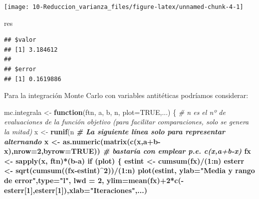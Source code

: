\documentclass[
]{book}
\newenvironment{Shaded}{\begin{snugshade}}{\end{snugshade}}
\newcommand{\CommentTok}[1]{\textcolor[rgb]{0.56,0.35,0.01}{\textit{#1}}}
\newcommand{\ControlFlowTok}[1]{\textcolor[rgb]{0.13,0.29,0.53}{\textbf{#1}}}
\newcommand{\DataTypeTok}[1]{\textcolor[rgb]{0.13,0.29,0.53}{#1}}
\newcommand{\DecValTok}[1]{\textcolor[rgb]{0.00,0.00,0.81}{#1}}
\newcommand{\KeywordTok}[1]{\textcolor[rgb]{0.13,0.29,0.53}{\textbf{#1}}}
\newcommand{\NormalTok}[1]{#1}
\newcommand{\OperatorTok}[1]{\textcolor[rgb]{0.81,0.36,0.00}{\textbf{#1}}}
\newcommand{\OtherTok}[1]{\textcolor[rgb]{0.56,0.35,0.01}{#1}}
\newcommand{\StringTok}[1]{\textcolor[rgb]{0.31,0.60,0.02}{#1}}
\theoremstyle{break}
\theoremstyle{definition}
\theoremstyle{definition}
\theoremstyle{definition}
\theoremstyle{remark}
\begin{document}
\begin{center}\texttt{[image: 10-Reduccion\_varianza\_files/figure-latex/unnamed-chunk-4-1]} \end{center}

\begin{Shaded}
\begin{Highlighting}[]
\NormalTok{res}
\end{Highlighting}
\end{Shaded}

\begin{verbatim}
## $valor
## [1] 3.184612
## 
## $error
## [1] 0.1619886
\end{verbatim}

Para la integración Monte Carlo con variables antitéticas podríamos considerar:

\begin{Shaded}
\begin{Highlighting}[]
\NormalTok{mc.integrala <-}\StringTok{ }\ControlFlowTok{function}\NormalTok{(ftn, a, b, n, }\DataTypeTok{plot=}\OtherTok{TRUE}\NormalTok{,...) \{}
  \CommentTok{# n es el nº de evaluaciones de la función objetivo (para facilitar comparaciones, solo se genera la mitad)}
\NormalTok{  x <-}\StringTok{ }\KeywordTok{runif}\NormalTok{(n}\OperatorTok{%
  \CommentTok{# La siguiente línea solo para representar alternando}
\NormalTok{  x <-}\StringTok{ }\KeywordTok{as.numeric}\NormalTok{(}\KeywordTok{matrix}\NormalTok{(}\KeywordTok{c}\NormalTok{(x,a}\OperatorTok{+}\NormalTok{b}\OperatorTok{-}\NormalTok{x),}\DataTypeTok{nrow=}\DecValTok{2}\NormalTok{,}\DataTypeTok{byrow=}\OtherTok{TRUE}\NormalTok{))}
  \CommentTok{# bastaría con emplear p.e. c(x,a+b-x)}
\NormalTok{  fx <-}\StringTok{ }\KeywordTok{sapply}\NormalTok{(x, ftn)}\OperatorTok{*}\NormalTok{(b}\OperatorTok{-}\NormalTok{a)}
  \ControlFlowTok{if}\NormalTok{ (plot) \{}
\NormalTok{    estint <-}\StringTok{ }\KeywordTok{cumsum}\NormalTok{(fx)}\OperatorTok{/}\NormalTok{(}\DecValTok{1}\OperatorTok{:}\NormalTok{n)}
\NormalTok{    esterr <-}\StringTok{ }\KeywordTok{sqrt}\NormalTok{(}\KeywordTok{cumsum}\NormalTok{((fx}\OperatorTok{-}\NormalTok{estint)}\OperatorTok{^}\DecValTok{2}\NormalTok{))}\OperatorTok{/}\NormalTok{(}\DecValTok{1}\OperatorTok{:}\NormalTok{n)}
    \KeywordTok{plot}\NormalTok{(estint, }\DataTypeTok{ylab=}\StringTok{"Media y rango de error"}\NormalTok{,}\DataTypeTok{type=}\StringTok{"l"}\NormalTok{, }\DataTypeTok{lwd =} \DecValTok{2}\NormalTok{,}
         \DataTypeTok{ylim=}\KeywordTok{mean}\NormalTok{(fx)}\OperatorTok{+}\DecValTok{2}\OperatorTok{*}\KeywordTok{c}\NormalTok{(}\OperatorTok{-}\NormalTok{esterr[}\DecValTok{1}\NormalTok{],esterr[}\DecValTok{1}\NormalTok{]),}\DataTypeTok{xlab=}\StringTok{"Iteraciones"}\NormalTok{,...)}
}
\end{Highlighting}
\end{Shaded}
\end{document}
